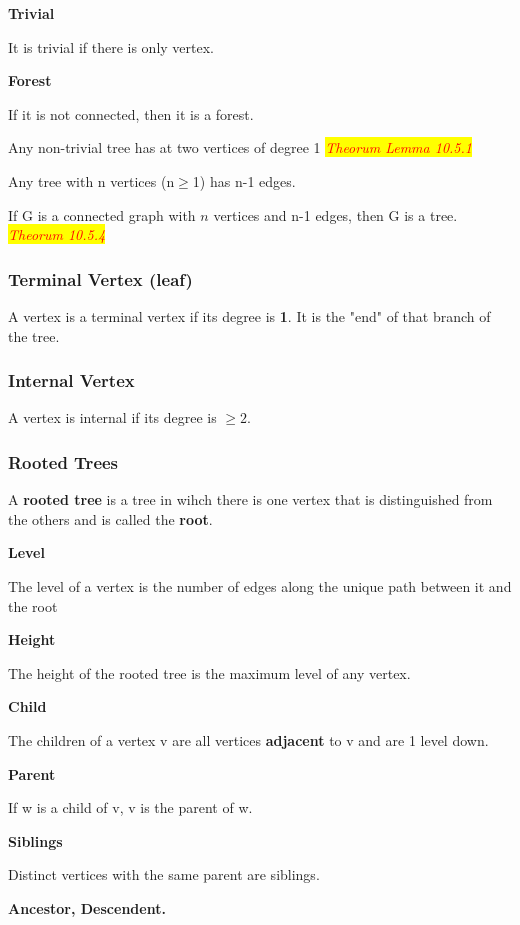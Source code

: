 \documentclass{article}
\newcommand{\theorum}[1]{\quad \quad \colorbox{yellow}{\textit{\textcolor{red}{Theorum #1}}}}
\newcommand{\sub}[1]{\vspace{10pt}\textbf{#1}}
\newcommand{\sbreak}{\vspace{10pt}}
\begin{document}
\sub{Trivial}

It is trivial if there is only vertex.

\sub{Forest}

If it is not connected, then it is a forest.

\sbreak

Any non-trivial tree has at two vertices of degree 1 \theorum{Lemma 10.5.1}

\sbreak

Any tree with n vertices (n$\geq$1) has n-1 edges.

\sbreak

If G is a connected graph with $n$ vertices and n-1 edges, then G is a tree. \theorum{10.5.4}

\subsubsection{Terminal Vertex (leaf)}
A vertex is a terminal vertex if its degree is \textbf{1}. It is the "end" of that branch of the tree.

\subsubsection{Internal Vertex}
A vertex is internal if its degree is $\geq 2$.

\subsubsection{Rooted Trees}
A \textbf{rooted tree} is a tree in wihch there is one vertex that is distinguished from the others and is called the \textbf{root}.

\sub{Level}

The level of a vertex is the number of edges along the unique path between it and the root

\sub{Height}

The height of the rooted tree is the maximum level of any vertex.

\sub{Child}

The children of a vertex v are all vertices \textbf{adjacent} to v and are 1 level down.


\sub{Parent}

If w is a child of v, v is the parent of w.

\sub{Siblings}

Distinct vertices with the same parent are siblings.

\sub{Ancestor, Descendent.}
\end{document}
